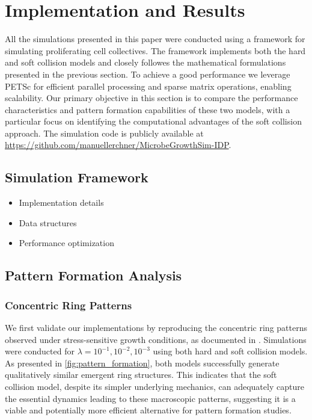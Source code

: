 \documentclass[conference]{IEEEtran}
\begin{document}
\newpage

\section{Implementation and Results}

All the simulations presented in this paper were conducted using a framework for simulating proliferating cell collectives. The framework implements both the hard and soft collision models and closely followes the mathematical formulations presented in the previous section. To achieve a good performance we leverage PETSc \cite{petsc-web-page} for efficient parallel processing and sparse matrix operations, enabling scalability. Our primary objective in this section is to compare the performance characteristics and pattern formation capabilities of these two models, with a particular focus on identifying the computational advantages of the soft collision approach. The simulation code is publicly available at {\color{blue}\url{https://github.com/manuellerchner/MicrobeGrowthSim-IDP}}.








\subsection{Simulation Framework}
\begin{itemize}
    \item Implementation details
    \item Data structures
    \item Performance optimization
\end{itemize}

\newpage

\subsection{Pattern Formation Analysis}

\subsubsection{Concentric Ring Patterns}

We first validate our implementations by reproducing the concentric ring patterns observed under stress-sensitive growth conditions, as documented in \cite{Weady2024}. Simulations were conducted for $\lambda = 10^{-1}, 10^{-2}, 10^{-3}$ using both hard and soft collision models. As presented in \autoref{fig:pattern_formation}, both models successfully generate qualitatively similar emergent ring structures. This indicates that the soft collision model, despite its simpler underlying mechanics, can adequately capture the essential dynamics leading to these macroscopic patterns, suggesting it is a viable and potentially more efficient alternative for pattern formation studies.
\end{document}
